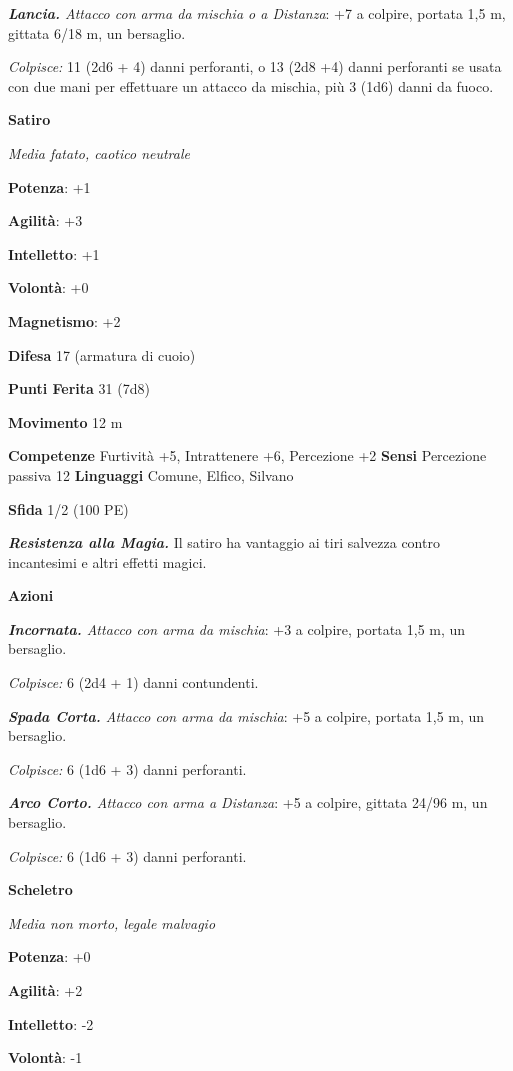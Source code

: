 \begin{multicols}{2}
\emph{\textbf{Lancia.} Attacco con arma da mischia o a Distanza}: +7 a
colpire, portata 1,5 m, gittata 6/18 m, un bersaglio.

\emph{Colpisce:} 11 (2d6 + 4) danni perforanti, o 13 (2d8 +4) danni
perforanti se usata con due mani per effettuare un attacco da mischia,
più 3 (1d6) danni da fuoco.



\textbf{Satiro}

\emph{Media fatato, caotico neutrale}

\textbf{Potenza}: +1

\textbf{Agilità}: +3

\textbf{Intelletto}: +1

\textbf{Volontà}: +0

\textbf{Magnetismo}: +2

\textbf{Difesa} 17 (armatura di cuoio)

\textbf{Punti Ferita} 31 (7d8)

\textbf{Movimento} 12 m

\textbf{Competenze} Furtività +5, Intrattenere +6, Percezione +2
\textbf{Sensi} Percezione passiva 12 \textbf{Linguaggi} Comune, Elfico,
Silvano

\textbf{Sfida} 1/2 (100 PE)

\emph{\textbf{Resistenza alla Magia.}} Il satiro ha vantaggio ai tiri
salvezza contro incantesimi e altri effetti magici.

\textbf{Azioni}

\emph{\textbf{Incornata.} Attacco con arma da mischia}: +3 a colpire,
portata 1,5 m, un bersaglio.

\emph{Colpisce:} 6 (2d4 + 1) danni contundenti.

\emph{\textbf{Spada Corta.} Attacco con arma da mischia}: +5 a colpire,
portata 1,5 m, un bersaglio.

\emph{Colpisce:} 6 (1d6 + 3) danni perforanti.

\emph{\textbf{Arco Corto.} Attacco con arma a Distanza}: +5 a colpire,
gittata 24/96 m, un bersaglio.

\emph{Colpisce:} 6 (1d6 + 3) danni perforanti.

\textbf{Scheletro}

\emph{Media non morto, legale malvagio}

\textbf{Potenza}: +0

\textbf{Agilità}: +2

\textbf{Intelletto}: -2

\textbf{Volontà}: -1


\end{multicols}
